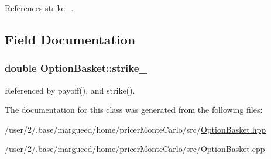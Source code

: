 References strike\-\_\-.



\subsection{Field Documentation}
\hypertarget{classOptionBasket_a577ab909d0049dd2036b6751f64f93f4}{
\subsubsection[{strike\-\_\-}]{\setlength{\rightskip}{0pt plus 5cm}double Option\-Basket\-::strike\-\_\-\hspace{0.3cm}{\ttfamily [protected]}}}\label{classOptionBasket_a577ab909d0049dd2036b6751f64f93f4}


Referenced by payoff(), and strike().



The documentation for this class was generated from the following files\-:\begin{DoxyCompactItemize}
\item 
/user/2/.\-base/margueed/home/pricer\-Monte\-Carlo/src/\hyperlink{OptionBasket_8hpp}{Option\-Basket.\-hpp}\item 
/user/2/.\-base/margueed/home/pricer\-Monte\-Carlo/src/\hyperlink{OptionBasket_8cpp}{Option\-Basket.\-cpp}\end{DoxyCompactItemize}

